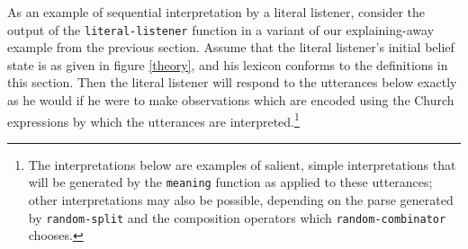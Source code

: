 \documentclass[12pt]{article}
\begin{document}
As an example of sequential interpretation by a literal listener, consider the output of the \lstinline{literal-listener} function in a variant of our explaining-away example from the previous section. 
Assume that the literal listener's initial belief state is as given in figure \ref{theory}, and his lexicon conforms to the definitions in this section. 
Then the literal listener will respond to the utterances below exactly as he would if he were to make observations which are encoded using the Church expressions by which the utterances are interpreted.\footnote{The interpretations below are examples of salient, simple interpretations that will be generated by the \lstinline{meaning} function as applied to these utterances; other interpretations may also be possible, depending on the parse generated by \lstinline{random-split} and the composition operators which \lstinline{random-combinator} chooses.}
\end{document}
